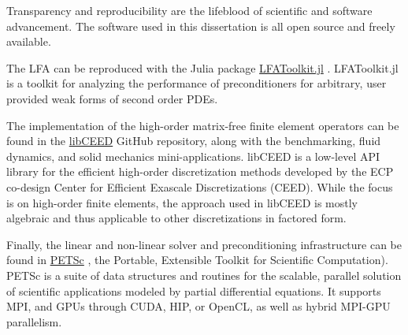 Transparency and reproducibility are the lifeblood of scientific and software advancement.
The software used in this dissertation is all open source and freely available.

The LFA can be reproduced with the Julia package \href{https://www.github.com/jeremylt/LFAToolkit.jl}{LFAToolkit.jl} \cite{thompson2021toolkit}.
LFAToolkit.jl is a toolkit for analyzing the performance of preconditioners for arbitrary, user provided weak forms of second order PDEs.

The implementation of the high-order matrix-free finite element operators can be found in the \href{https://www.github.com/CEED/libCEED}{libCEED} GitHub repository, along with the benchmarking, fluid dynamics, and solid mechanics mini-applications.
libCEED \cite{libceed, libceed-user-manual, scipy2020} is a low-level API library for the efficient high-order discretization methods developed by the ECP co-design Center for Efficient Exascale Discretizations (CEED).
While the focus is on high-order finite elements, the approach used in libCEED is mostly algebraic and thus applicable to other discretizations in factored form.

Finally, the linear and non-linear solver and preconditioning infrastructure can be found in \href{https://www.mcs.anl.gov/petsc/}{PETSc} \cite{petsc-user-ref}, the Portable, Extensible Toolkit for Scientific Computation).
PETSc is a suite of data structures and routines for the scalable, parallel solution of scientific applications modeled by partial differential equations.
It supports MPI, and GPUs through CUDA, HIP, or OpenCL, as well as hybrid MPI-GPU parallelism.